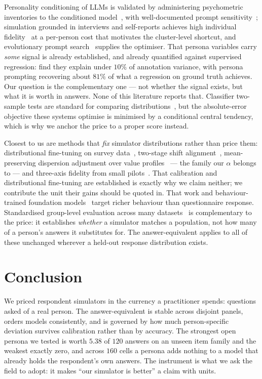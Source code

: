 \documentclass[11pt]{article}
\begin{document}
Personality conditioning of LLMs is validated by administering psychometric
inventories to the conditioned
model~\citep{serapio2023personality,jiang2024evaluating}, with well-documented
prompt sensitivity~\citep{han2026context,gupta2024personas}; simulation grounded
in interviews and self-reports achieves high individual
fidelity~\citep{park2026selfreports} at a per-person cost that motivates the
cluster-level shortcut, and evolutionary prompt
search~\citep{guo2024connecting,prasad2023grips,zhou2022large} supplies the
optimiser. That persona variables carry \emph{some} signal is already
established, and already quantified against supervised regression:
\citet{hu2024persona} find they explain under $10\%$ of annotation variance,
with persona prompting recovering about $81\%$ of what a regression on ground
truth achieves. Our question is the complementary one --- not whether the signal
exists, but what it is worth in answers. None of this literature reports that. Classifier two-sample
tests are standard for comparing
distributions~\citep{lopezpaz2017revisiting}, but the absolute-error objective
these systems optimise is minimised by a conditional central tendency, which is
why we anchor the price to a proper score instead.

Closest to us are methods that \emph{fix} simulator distributions rather than
price them: distributional fine-tuning on survey data~\citep{suh2025subpop},
two-stage shift alignment~\citep{huang2026dsa}, mean-preserving dispersion
adjustment over value profiles~\citep{abels2026valuepersonas} --- the family our
$\alpha$ belongs to --- and three-axis fidelity from small
pilots~\citep{choi2026beyondmean}. That calibration and distributional
fine-tuning are established is exactly why we claim neither; we contribute the
unit their gains should be quoted in. That work and behaviour-trained foundation
models~\citep{huang2026behaviorbench,binz2025centaur} target richer behaviour
than questionnaire response. Standardised group-level evaluation across many
datasets~\citep{hu2026simbench} is complementary to the price: it establishes
\emph{whether} a simulator matches a population, not how many of a person's
answers it substitutes for. The answer-equivalent applies to all of these
unchanged wherever a held-out response distribution exists.

\section{Conclusion}

We priced respondent simulators in the currency a practitioner spends: questions
asked of a real person. The answer-equivalent is stable across disjoint panels,
orders models consistently, and is governed by how much person-specific deviation
survives calibration rather than by accuracy. The strongest open persona we
tested is worth $5.38$ of $120$ answers on an unseen item family and the weakest
exactly zero, and across $160$ cells a persona adds nothing to a model that
already holds the respondent's own answers. The instrument is what we ask the
field to adopt: it makes ``our simulator is better'' a claim with units.
\end{document}

